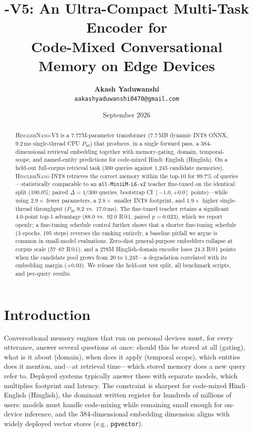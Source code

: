 \documentclass[11pt]{article}
\title{\textbf{\nano{}-V5: An Ultra-Compact Multi-Task Encoder for\\ Code-Mixed Conversational Memory on Edge Devices}}
\author{\textbf{Akash Yaduwanshi}\\ \texttt{aakashyaduwanshi0470@gmail.com}}
\date{September 2026}
\newcommand{\nano}{\textsc{HinglishNano}}
\begin{document}
\maketitle

\begin{abstract}
\nano{}-V5 is a 7.77M-parameter transformer (7.7\,MB dynamic INT8 ONNX, 9.2\,ms single-thread CPU $P_{50}$) that produces, in a single forward pass, a 384-dimensional retrieval embedding together with memory-gating, domain, temporal-scope, and named-entity predictions for code-mixed Hindi--English (Hinglish). On a held-out full-corpus retrieval task (300 queries against 1{,}245 candidate memories), \nano{} INT8 retrieves the correct memory within the top-10 for 99.7\% of queries---statistically comparable to an \texttt{all-MiniLM-L6-v2} teacher fine-tuned on the identical split (100.0\%; paired $\Delta=1/300$ queries, bootstrap CI $[-1.0,+0.0]$ points)---while using $2.9\times$ fewer parameters, a $2.8\times$ smaller INT8 footprint, and $1.9\times$ higher single-thread throughput ($P_{50}$ 9.2 vs.\ 17.0\,ms). The fine-tuned teacher retains a significant 4.0-point top-1 advantage (88.0 vs.\ 92.0 R@1, paired $p=0.023$), which we report openly; a fine-tuning schedule control further shows that a shorter fine-tuning schedule (3 epochs, 195 steps) reverses the ranking entirely, a baseline pitfall we argue is common in small-model evaluations. Zero-shot general-purpose embedders collapse at corpus scale (57--67 R@1), and a 278M Hinglish-domain encoder loses 24.3 R@1 points when the candidate pool grows from 20 to 1{,}245---a degradation correlated with its embedding margin ($+0.03$). We release the held-out test split, all benchmark scripts, and per-query results.
\end{abstract}

\section{Introduction}
Conversational memory engines that run on personal devices must, for every utterance, answer several questions at once: should this be stored at all (gating), what is it about (domain), when does it apply (temporal scope), which entities does it mention, and---at retrieval time---which stored memory does a new query refer to. Deployed systems typically answer these with separate models, which multiplies footprint and latency. The constraint is sharpest for code-mixed Hindi--English (Hinglish), the dominant written register for hundreds of millions of users: models must handle code-mixing while remaining small enough for on-device inference, and the 384-dimensional embedding dimension aligns with widely deployed vector stores (e.g., \texttt{pgvector}).
\end{document}
